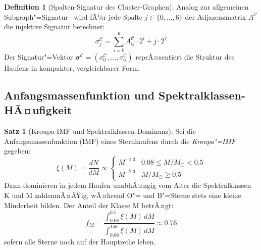 ﻿\documentclass[a4paper,12pt]{article}
\theoremstyle{definition}
\newtheorem{definition}{Definition}
\newtheorem{satz}{Satz}
\begin{document}
\begin{definition}[Spalten-Signatur des Cluster-Graphen]
\label{def:clustersig}
    Analog zur allgemeinen Subgraph"=Signatur~\cite{subgraph2026}
    wird fÃ¼r jede Spalte $j \in \{0,\ldots,6\}$ der Adjazenzmatrix
    $A^{\mathcal{C}}$ die injektive Signatur berechnet:
    \[
        \sigma_j^{\mathcal{C}} = \sum_{i=0}^{6} A^{\mathcal{C}}_{ij} \cdot 2^i
        + j \cdot 2^7
    \]
    Der Signatur"=Vektor $\boldsymbol{\sigma}^{\mathcal{C}} =
    (\sigma_0^{\mathcal{C}}, \ldots, \sigma_6^{\mathcal{C}})$
    reprÃ¤sentiert die Struktur des Haufens in kompakter, vergleichbarer Form.
\end{definition}

\subsection{Anfangsmassenfunktion und Spektralklassen-HÃ¤ufigkeit}

\begin{satz}[Kroupa-IMF und Spektralklassen-Dominanz]
\label{satz:imf}
    Sei die Anfangsmassenfunktion (IMF) eines Sternhaufens durch die
    \emph{Kroupa"=IMF}~\cite{kroupa2001} gegeben:
    \[
        \xi(M) = \frac{dN}{dM} \propto \begin{cases}
            M^{-1.3} & 0.08 \leq M/M_\odot < 0.5 \\
            M^{-2.3} & M/M_\odot \geq 0.5
        \end{cases}
    \]
    Dann dominieren in jedem Haufen unabhÃ¤ngig vom Alter die Spektralklassen
    K und M zahlenmÃ¤ÃŸig, wÃ¤hrend O"= und B"=Sterne stets eine kleine Minderheit
    bilden. Der Anteil der Klasse M betrÃ¤gt:
    \[
        f_M = \frac{\int_{0.08}^{0.5} \xi(M)\,dM}{\int_{0.08}^{150} \xi(M)\,dM}
        \approx 0.76
    \]
    sofern alle Sterne noch auf der Hauptreihe leben.
\end{satz}
\end{document}
